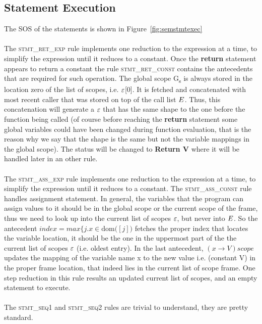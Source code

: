 \documentclass[UTF8]{article}
\begin{document}
\subsection{Statement Execution}
The SOS of the statements is shown in Figure~\ref{fig:semstmtexec}  
\\~\\
The \textsc{stmt\_ret\_exp} rule implements one reduction to the expression at a time, to simplify the expression until it reduces to a constant. 
Once the \textbf{return} statement appears to return a constant the rule \textsc{stmt\_ret\_const} contains the antecedents that are required for such operation. The global scope G\textsubscript{s}  is always stored in the location zero of the list of scopes, i.e. $\varepsilon$[0]. It is fetched and concatenated with most recent caller that was stored on top of the call list $E$. Thus, this concatenation will generate a $\varepsilon$ that has the same shape to the one before the function being called (of course before reaching the \textbf{return} statement some global variables could have been changed during function evaluation, that is the reason why we say that the shape is the same but not the variable mappings in the global scope). The status will be changed to \textbf{Return V} where it will be handled later in an other rule. 
\\~\\
The \textsc{stmt\_ass\_exp} rule implements one reduction to the expression at a time, to simplify the expression until it reduces to a constant.
The \textsc{stmt\_ass\_const} rule handles assignment statement. In general, the variables that the program can assign values to it should be in the global scope or the current scope of the frame, thus we need to look up into the current list of scopes $\varepsilon$, but never into $E$. So the antecedent $index = max  \{ j . x  \in \mathrm{dom} ( $\currsf$ [j] ) $ fetches the proper index that locates the variable location, it should be the one in the uppermost part of the the current list of scopes $\varepsilon$ (i.e. oldest entry). In the last antecedent, $ (x \longrightarrow V )scope $ updates the mapping of the variable name x to the new value i.e. (constant V) in the proper frame location, that indeed lies in the current list of scope frame. One step reduction in this rule results an updated current list of scopes, and an empty statement to execute.
\\~\\
The \textsc{stmt\_seq1} and \textsc{stmt\_seq2} rules are trivial to understand, they are pretty standard.
\end{document}
